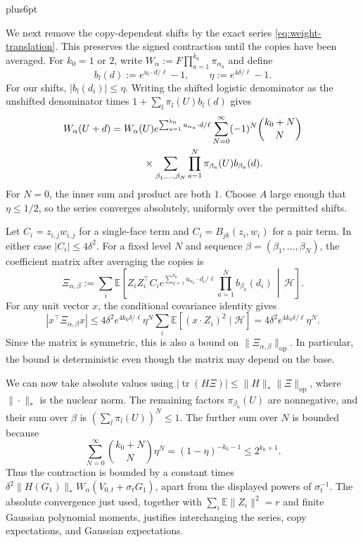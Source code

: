 \documentclass[11pt,letterpaper,twoside,leqno]{article}
\makeatletter
\theoremstyle{bookplain}
\theoremstyle{bookremark}
\renewenvironment{proof}[1][\proofname]{\par
  \pushQED{\qed}\normalfont\topsep6pt plus6pt\relax
  \trivlist\item[\hskip\labelsep\bfseries #1\@addpunct{.}]\ignorespaces
}{\popQED\endtrivlist\@endpefalse}
\newcommand{\E}{\mathbb E}
\newcommand{\tr}{\operatorname{tr}}
\newcommand{\op}{\mathrm{op}}
\makeatother
\begin{document}
\begin{proof}
We next remove the copy-dependent shifts by the exact series
\eqref{eq:weight-translation}. This preserves the signed
contraction until the copies have been averaged.
For $k_0=1$ or $2$, write
$W_\alpha:=F\prod_{a=1}^{k_0}\pi_{\alpha_a}$ and define
\[
 b_l(d):=e^{u_l\cdot d/\ell}-1,\qquad
 \eta:=e^{4\delta/\ell}-1.
\]
For our shifts, $|b_l(d_i)|\le\eta$.
Writing the shifted logistic denominator as the unshifted
denominator times $1+\sum_l\pi_l(U)b_l(d)$ gives
\[
 \begin{split}
 W_\alpha(U+d)
 ={}&W_\alpha(U)e^{\sum_{a=1}^{k_0}u_{\alpha_a}\cdot d/\ell}
 \sum_{N=0}^\infty(-1)^N\binom{k_0+N}{N}\\
 &\hspace{7mm}\times
 \sum_{\beta_1,\ldots,\beta_N}
       \prod_{a=1}^N\pi_{\beta_a}(U)b_{\beta_a}(d).
 \end{split}
\]
For $N=0$, the inner sum and product are both $1$.
Choose $A$ large enough that $\eta\le1/2$, so the series
converges absolutely, uniformly over the permitted shifts.

Let $C_i=z_{i,j}w_{i,j}$ for a single-face term and
$C_i=B_{jk}(z_i,w_i)$ for a pair term. In either case
$|C_i|\le4\delta^2$. For a fixed level $N$ and sequence
$\beta=(\beta_1,\ldots,\beta_N)$, the coefficient matrix
after averaging the copies is
\[
 \Xi_{\alpha,\beta}:=
 \sum_i\E\!\left[
 Z_iZ_i^\top C_i
 e^{\sum_{a=1}^{k_0}u_{\alpha_a}\cdot d_i/\ell}
 \prod_{a=1}^N b_{\beta_a}(d_i)
 \,\middle|\,\mathcal H\right].
\]
For any unit vector $x$, the conditional covariance identity gives
\[
 |x^\top\Xi_{\alpha,\beta}x|
 \le4\delta^2e^{4k_0\delta/\ell}\eta^N
       \sum_i\E[(x\cdot Z_i)^2\mid\mathcal H]
 =4\delta^2e^{4k_0\delta/\ell}\eta^N.
\]
Since the matrix is symmetric, this is also a bound on
$\|\Xi_{\alpha,\beta}\|_{\op}$. In particular, the bound
is deterministic even though the matrix may depend on the base.

We can now take absolute values using
$|\tr(H\Xi)|\le\|H\|_*\|\Xi\|_{\op}$, where
$\|\cdot\|_*$ is the nuclear norm. The remaining factors
$\pi_{\beta_a}(U)$ are nonnegative, and their sum over
$\beta$ is $(\sum_l\pi_l(U))^N\le1$.
The further sum over $N$ is bounded because
\[
 \sum_{N=0}^\infty\binom{k_0+N}{N}\eta^N
 =(1-\eta)^{-k_0-1}\le2^{k_0+1}.
\]
Thus the contraction is bounded by a constant times
$\delta^2\|H(G_1)\|_*W_\alpha(V_{0,t}+\sigma_tG_1)$,
apart from the displayed powers of $\sigma_t^{-1}$.
The absolute convergence just used, together with
$\sum_i\E\|Z_i\|^2=r$ and finite Gaussian polynomial
moments, justifies interchanging the series, copy expectations,
and Gaussian expectations.


\end{proof}
\end{document}
